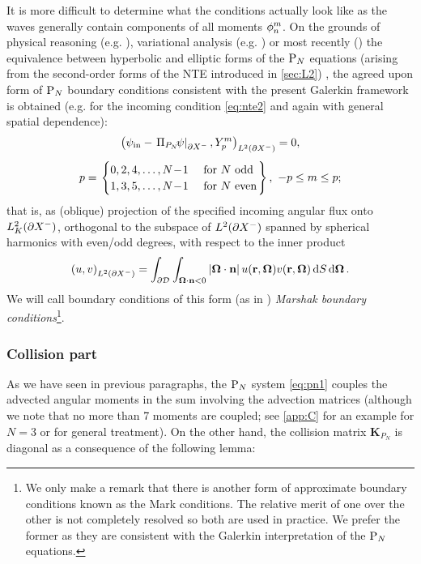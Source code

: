 It is more difficult to determine what the conditions actually look like as the
waves generally contain components of all moments $\angmom{n}{m}$. On the grounds of physical reasoning
(e.g. \cite{Rumyantsev}), variational analysis (e.g. \cite{Davis}) or most recently (\cite{Sanchez8}) the equivalence
between hyperbolic and elliptic forms of the $\PN$ equations (arising from the second-order forms of the NTE introduced
in \ref{sec:L2}) , the agreed upon form of $\PN$ boundary conditions consistent with the present Galerkin framework is
obtained (e.g. for the incoming condition \eqref{eq:nte2} and again with general spatial dependence):
\begin{equation}\label{eq:pn_bc}
\begin{gathered}
	\left(\psi_\text{in} - \left.\Projop[P_N]\!\psi\right\vert_{\pX[-]}, \Y{p}{m} \right)_{\Lp[2](\pX[-])} = 0,\\[.35em] 
	p = 
	\left.\begin{cases}
		0,2,4,\ldots,N\!-\!1 & \mbox{ for $N$ odd}\\
		1,3,5,\ldots,N\!-\!1 & \mbox{ for $N$ even}	
	\end{cases}\right\},\ -p \leq m \leq p;
\end{gathered}
\end{equation}
that is, as (oblique) projection of the specified incoming angular flux onto $\Lp[2]_{K}(\pX[-])$,
orthogonal to the subspace of $\Lp[2](\pX[-])$ spanned by spherical harmonics with even/odd degrees, with respect to the inner
product
$$
	\left(u,v\right)_{\Lp[2](\pX[-])} = \int_{\pV}\int_{\bomega\cdot\bn < 0}\abs{\bomega\cdot\bn}
	u(\br,\bomega)v(\br,\bomega)\,\d{S}\d{\bomega}.
$$
 We will call boundary conditions of this form (as in \cite{Davis}) \textit{Marshak boundary
conditions}\footnote{We only make a remark that there is 
another form of approximate boundary conditions known as the Mark conditions. The relative merit of one over the other 
is not completely resolved so both are used in practice. We prefer the former as they are consistent with the Galerkin 
interpretation of the $\PN$ equations.}.

\subsubsection{Collision part}
As we have seen in previous paragraphs, the $\PN$ system \eqref{eq:pn1} couples the advected angular moments in the sum
involving the advection matrices (although we note that no more than 7 moments are coupled; see \ref{app:C} for an
example for $N = 3$ or \cite[App. A]{Sanchez8} for general treatment). 
On the other hand, the collision matrix $\mathbf{K}_{P_N}$ is
diagonal as
 a consequence of the following lemma:

